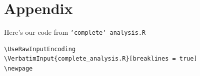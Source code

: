 \documentclass[10pt,a4paper]{article}
\begin{document}
\section{Appendix}
Here's our code from \texttt{\char`complete\char`_analysis.R}

\begin{lstlisting}
\UseRawInputEncoding
\VerbatimInput{complete_analysis.R}[breaklines = true]
\newpage
\end{lstlisting}



 


\end{document}

